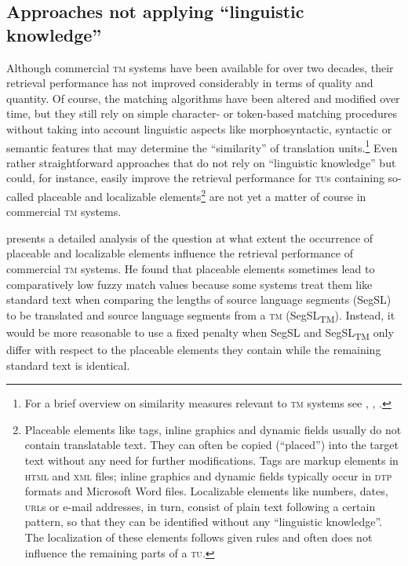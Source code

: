 \documentclass[output=paper]{LSP/langsci}
\begin{document}
\subsection{Approaches not applying ``linguistic knowledge''}\label{sec:reinke:3.1}
 
Although commercial \textsc{tm} systems have been available for over two decades, their retrieval performance has not improved considerably in terms of quality and quantity. Of course, the matching algorithms have been altered and modified over time, but they still rely on simple character- or token-based matching procedures without taking into account linguistic aspects like morphosyntactic, syntactic or semantic features that may determine the ``similarity'' of translation units.\footnote{For a brief overview on similarity measures relevant to \textsc{tm} systems see \citet[61--68]{Trujillo1999}, \citet[193--198]{Reinke2004}, \citealt{Sikes2007}.} Even rather straightforward approaches that do not rely on ``linguistic knowledge'' but could, for instance, easily improve the retrieval performance for \textsc{tu}s containing so-called placeable and localizable elements\footnote{Placeable elements like tags, inline graphics and dynamic fields usually do not contain translatable text. They can often be copied (``placed'') into the target text without any need for further modifications. Tags are markup elements in \textsc{html} and \textsc{xml} files; inline graphics and dynamic fields typically occur in \textsc{dtp} formats and Microsoft Word files. Localizable elements like numbers, dates, \textsc{url}s or e-mail addresses, in turn, consist of plain text following a certain pattern, so that they can be identified without any ``linguistic knowledge''. The localization of these elements follows given rules and often does not influence the remaining parts of a \textsc{tu}.} are not yet a matter of course in commercial \textsc{tm} systems.
 
\citet{Azzano2011} presents a detailed analysis of the question at what extent the occurrence of placeable and localizable elements influence the retrieval performance of commercial \textsc{tm} systems. He found that placeable elements sometimes lead to comparatively low fuzzy match values because some systems treat them like standard text when comparing the lengths of source language segments (SegSL) to be translated and source language segments from a \textsc{tm} (SegSL\textsubscript{TM}). Instead, it would be more reasonable to use a fixed penalty when SegSL and SegSL\textsubscript{TM} only differ with respect to the placeable elements they contain while the remaining standard text is identical.
 
\end{document}
